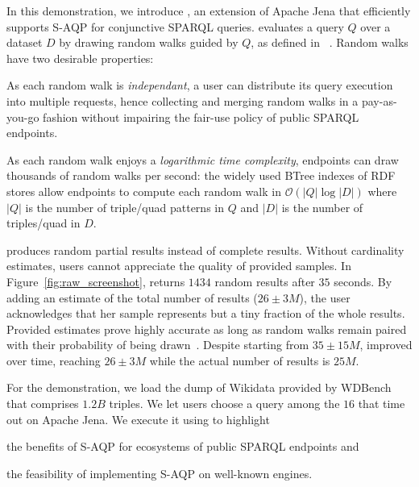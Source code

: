 In this demonstration, we introduce \NAME, an extension of Apache Jena
that efficiently supports S-AQP for conjunctive SPARQL queries. \NAME
evaluates a query $Q$ over a dataset $D$ by drawing random walks
guided by $Q$, as defined in \WANDER~\cite{li2019wanderjoin}. Random
walks have two desirable properties:
\begin{inparaenum}[(i)]
\item As each random walk is \emph{independant}, a user can distribute
  its query execution into multiple requests, hence collecting and
  merging random walks in a pay-as-you-go fashion without impairing
  the fair-use policy of public SPARQL endpoints.
\item As each random walk enjoys a \emph{logarithmic time complexity},
  endpoints can draw thousands of random walks per second: the widely
  used BTree indexes of RDF stores allow endpoints to compute each
  random walk in $\mathcal{O}(|Q| \log |D|)$ where $|Q|$ is the number
  of triple/quad patterns in $Q$ and $|D|$ is the number of
  triples/quad in $D$.
\end{inparaenum}

\NAME produces random partial results instead of complete
results. Without cardinality estimates, users cannot appreciate the
quality of provided samples. In Figure~\ref{fig:raw_screenshot}, \NAME
returns $1434$ random results after $35$ seconds. By adding an
estimate of the total number of results ($26 \pm 3M$), the user
acknowledges that her sample represents but a tiny fraction of the
whole results.  Provided estimates prove highly accurate as long as
random walks remain paired with their probability of being
drawn~\cite{DBLP:conf/sigmod/ParkKBKHH20}. Despite starting from $35
\pm 15M$, \NAME improved over time, reaching $26\pm 3M$ while the
actual number of results is $25M$.

For the demonstration, we load the dump of Wikidata provided by
WDBench~\cite{angles2022wdbench} that comprises $1.2B$ triples.  We
let users choose a query among the $16$ that time out on Apache
Jena. We execute it using \NAME to highlight
\begin{inparaenum}[(i)]
\item the benefits of S-AQP for ecosystems of public SPARQL endpoints
  and
\item the feasibility of implementing S-AQP on well-known engines.
\end{inparaenum}

%


